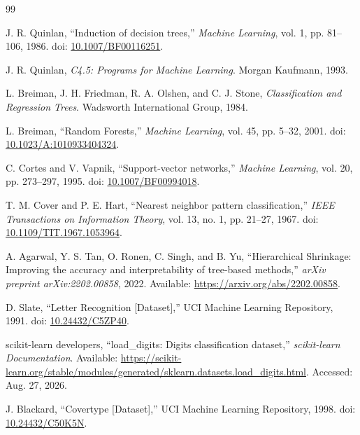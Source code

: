 \clearpage
\renewcommand{\bibname}{Tài liệu tham khảo}
{}

\begin{thebibliography}{99}
\sloppy
\setlength{\itemsep}{0.55em}
\setlength{\parsep}{0pt}

J. R. Quinlan,
``Induction of decision trees,''
\textit{Machine Learning}, vol. 1, pp. 81--106, 1986.
doi: \href{https://doi.org/10.1007/BF00116251}{10.1007/BF00116251}.

J. R. Quinlan,
\textit{C4.5: Programs for Machine Learning}.
Morgan Kaufmann, 1993.

L. Breiman, J. H. Friedman, R. A. Olshen, and C. J. Stone,
\textit{Classification and Regression Trees}.
Wadsworth International Group, 1984.

L. Breiman,
``Random Forests,''
\textit{Machine Learning}, vol. 45, pp. 5--32, 2001.
doi: \href{https://doi.org/10.1023/A:1010933404324}{10.1023/A:1010933404324}.

C. Cortes and V. Vapnik,
``Support-vector networks,''
\textit{Machine Learning}, vol. 20, pp. 273--297, 1995.
doi: \href{https://doi.org/10.1007/BF00994018}{10.1007/BF00994018}.

T. M. Cover and P. E. Hart,
``Nearest neighbor pattern classification,''
\textit{IEEE Transactions on Information Theory}, vol. 13, no. 1, pp. 21--27, 1967.
doi: \href{https://doi.org/10.1109/TIT.1967.1053964}{10.1109/TIT.1967.1053964}.

A. Agarwal, Y. S. Tan, O. Ronen, C. Singh, and B. Yu,
``Hierarchical Shrinkage: Improving the accuracy and interpretability of tree-based methods,''
\textit{arXiv preprint arXiv:2202.00858}, 2022.
Available: \url{https://arxiv.org/abs/2202.00858}.

D. Slate,
``Letter Recognition [Dataset],''
UCI Machine Learning Repository, 1991.
doi: \href{https://doi.org/10.24432/C5ZP40}{10.24432/C5ZP40}.

scikit-learn developers,
``load\_digits: Digits classification dataset,''
\textit{scikit-learn Documentation}.
Available: \url{https://scikit-learn.org/stable/modules/generated/sklearn.datasets.load_digits.html}.
Accessed: Aug. 27, 2026.

J. Blackard,
``Covertype [Dataset],''
UCI Machine Learning Repository, 1998.
doi: \href{https://doi.org/10.24432/C50K5N}{10.24432/C50K5N}.


\end{thebibliography}
